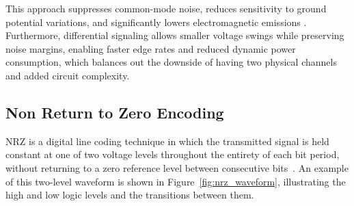 This approach suppresses common-mode noise, reduces sensitivity to ground potential variations, and significantly lowers electromagnetic emissions \cite{bogatin_SI,dally_poulton_1998}. Furthermore, differential signaling allows smaller voltage swings while preserving noise margins, enabling faster edge rates and reduced dynamic power consumption, which balances out the downside of having two physical channels and added circuit complexity.

\subsection{Non Return to Zero Encoding} \label{sec:nrz_encoding}

\ac{NRZ} is a digital line coding technique in which the transmitted signal is held constant at one of two voltage levels throughout the entirety of each bit period, without returning to a zero reference level between consecutive bits~\cite{razavi_NRZ_PAM4,zamir2018_nrz_pam4}.
An example of this two-level waveform is shown in Figure~\ref{fig:nrz_waveform}, illustrating the high and low logic levels and the transitions between them.

